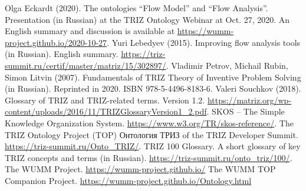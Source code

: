 \documentclass[11pt,a4paper]{article}
\begin{document}
\begin{thebibliography}{xxx}
\raggedright
{} Olga Eckardt (2020).  The ontologies “Flow Model” and
  “Flow Analysis”. Presentation (in Russian) at the TRIZ Ontology Webinar at
  Oct. 27, 2020.  An English summary and discussion is available at
  \url{https://wumm-project.github.io/2020-10-27}.
 Yuri Lebedyev (2015). Improving flow analysis tools (in
  Russian).  English summary.
  \url{https://triz-summit.ru/certif/master/matriz/15/302897/}.
 Vladimir Petrov, Michail Rubin, Simon Litvin (2007).
  Fundamentals of TRIZ Theory of Inventive Problem Solving (in Russian).
  Reprinted in 2020. ISBN 978-5-4496-8183-6.
 Valeri Souchkov (2018).  Glossary of TRIZ and
  TRIZ-related terms. Version 1.2.
  \url{https://matriz.org/wp-content/uploads/2016/11/TRIZGlossaryVersion1_2.pdf}. 
 SKOS -- The Simple Knowledge Organization System.
  \url{https://www.w3.org/TR/skos-reference/}.  
 The TRIZ Ontology Project (TOP)
  \foreignlanguage{russian}{Онтология ТРИЗ} of the TRIZ Developer Summit.
  \url{https://triz-summit.ru/Onto_TRIZ/}.
 TRIZ 100 Glossary. A short glossary of key TRIZ
  concepts and terms (in Russian).
  \url{https://triz-summit.ru/onto_triz/100/}.
 The WUMM Project. \url{https://wumm-project.github.io/} 
 The WUMM TOP Companion Project.
  \url{https://wumm-project.github.io/Ontology.html} 
\end{thebibliography}
\end{document}
